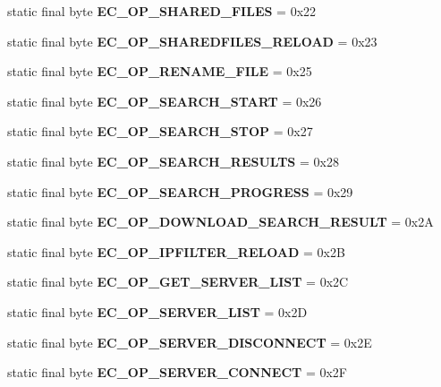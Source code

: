\begin{DoxyCompactItemize}
\item 
static final byte {\bfseries EC\_\-OP\_\-SHARED\_\-FILES} = 0x22\label{interfaceECCodes_ae7ec7549cababc3f3a5bce608888f24a}

\item 
static final byte {\bfseries EC\_\-OP\_\-SHAREDFILES\_\-RELOAD} = 0x23\label{interfaceECCodes_affa0994476f4a620b2b65f07a26cb6ba}

\item 
static final byte {\bfseries EC\_\-OP\_\-RENAME\_\-FILE} = 0x25\label{interfaceECCodes_a5fbeadf2370f6ed13d49ddde2829290f}

\item 
static final byte {\bfseries EC\_\-OP\_\-SEARCH\_\-START} = 0x26\label{interfaceECCodes_ad478edb16490ef93a1beb05a9f6d336f}

\item 
static final byte {\bfseries EC\_\-OP\_\-SEARCH\_\-STOP} = 0x27\label{interfaceECCodes_aac1295802cd475319814d005bb2a5904}

\item 
static final byte {\bfseries EC\_\-OP\_\-SEARCH\_\-RESULTS} = 0x28\label{interfaceECCodes_a1d46c2288e4a0bd7b29a4fac38d0fdeb}

\item 
static final byte {\bfseries EC\_\-OP\_\-SEARCH\_\-PROGRESS} = 0x29\label{interfaceECCodes_aadb589c738fac6bd90f41b1a9377acaa}

\item 
static final byte {\bfseries EC\_\-OP\_\-DOWNLOAD\_\-SEARCH\_\-RESULT} = 0x2A\label{interfaceECCodes_a05d03b34fb75f967e7d8e1790982d3ba}

\item 
static final byte {\bfseries EC\_\-OP\_\-IPFILTER\_\-RELOAD} = 0x2B\label{interfaceECCodes_a25b0e2e194daa25e88a1d03c51e84037}

\item 
static final byte {\bfseries EC\_\-OP\_\-GET\_\-SERVER\_\-LIST} = 0x2C\label{interfaceECCodes_ae33ee2e1bd2f034d1fb4f4082d2fe05b}

\item 
static final byte {\bfseries EC\_\-OP\_\-SERVER\_\-LIST} = 0x2D\label{interfaceECCodes_a459e2e98cc6da8b932a70179190406ca}

\item 
static final byte {\bfseries EC\_\-OP\_\-SERVER\_\-DISCONNECT} = 0x2E\label{interfaceECCodes_a28acf5324f0639133afb71288bae885b}

\item 
static final byte {\bfseries EC\_\-OP\_\-SERVER\_\-CONNECT} = 0x2F\label{interfaceECCodes_a4f4b3a5f4a26857f70f8757e9e07f35a}


\end{DoxyCompactItemize}
